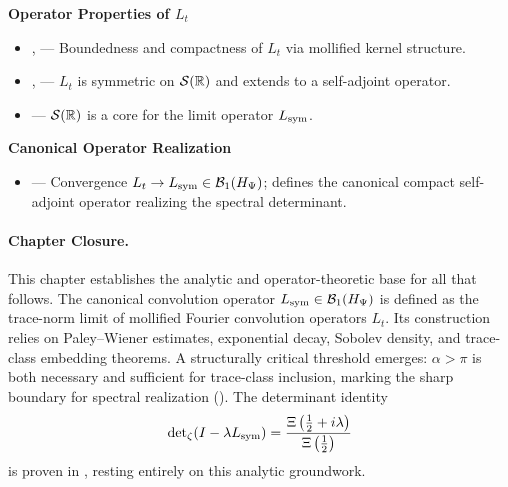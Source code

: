 \textbf{Operator Properties of \texorpdfstring{\( L_t \)}{Lt}}
\begin{itemize}
  \item {},  — Boundedness and compactness of \( L_t \) via mollified kernel structure.
  \item {},  — \( L_t \) is symmetric on \( \mathcal{S}(\mathbb{R}) \) and extends to a self-adjoint operator.
  \item {} — \( \mathcal{S}(\mathbb{R}) \) is a core for the limit operator \( L_{\mathrm{sym}} \).
\end{itemize}

\textbf{Canonical Operator Realization}
\begin{itemize}
  \item {} — Convergence \( L_t \to L_{\mathrm{sym}} \in \mathcal{B}_1(H_{\Psi}) \); defines the canonical compact self-adjoint operator realizing the spectral determinant.
\end{itemize}

\paragraph{Chapter Closure.}
This chapter establishes the analytic and operator-theoretic base for all that follows. The canonical convolution operator \( L_{\mathrm{sym}} \in \mathcal{B}_1(H_{\Psi}) \) is defined as the trace-norm limit of mollified Fourier convolution operators \( L_t \). Its construction relies on Paley--Wiener estimates, exponential decay, Sobolev density, and trace-class embedding theorems. A structurally critical threshold emerges: \( \alpha > \pi \) is both necessary and sufficient for trace-class inclusion, marking the sharp boundary for spectral realization (). The determinant identity
\[
\det\nolimits_{\zeta}(I - \lambda L_{\mathrm{sym}})
= \frac{\Xi\left(\tfrac{1}{2} + i\lambda \right)}{\Xi\left(\tfrac{1}{2} \right)}
\]
is proven in , resting entirely on this analytic groundwork.

